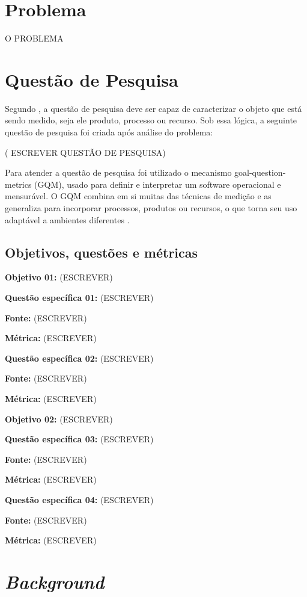 \section{Problema}

O PROBLEMA


\section{Questão de Pesquisa}

Segundo , a questão de pesquisa deve ser capaz de caracterizar o objeto que está sendo medido, seja ele produto, processo ou recurso. Sob essa lógica, a seguinte questão de pesquisa foi criada após análise do problema:

( ESCREVER QUESTÃO DE PESQUISA)

Para atender a questão de pesquisa foi utilizado o mecanismo goal-question-metrics (GQM), usado para definir e interpretar um software operacional e mensurável. O GQM combina em si muitas das técnicas de medição e as generaliza para incorporar processos, produtos ou recursos, o que torna seu uso adaptável a ambientes diferentes \cite{caldiera_goal_1994}. 


\subsection{Objetivos, questões e métricas}

\textbf{Objetivo 01:} (ESCREVER)

\textbf{Questão específica 01:} (ESCREVER)

\textbf{Fonte:} (ESCREVER)

\textbf{Métrica:} (ESCREVER)

\textbf{Questão específica 02:} (ESCREVER)

\textbf{Fonte:} (ESCREVER)

\textbf{Métrica:} (ESCREVER)

\textbf{Objetivo 02:} (ESCREVER)

\textbf{Questão específica 03:} (ESCREVER)

\textbf{Fonte:} (ESCREVER)

\textbf{Métrica:} (ESCREVER)


\textbf{Questão específica 04:} (ESCREVER)

\textbf{Fonte:} (ESCREVER)

\textbf{Métrica:} (ESCREVER)

\section{\textit{Background}}


